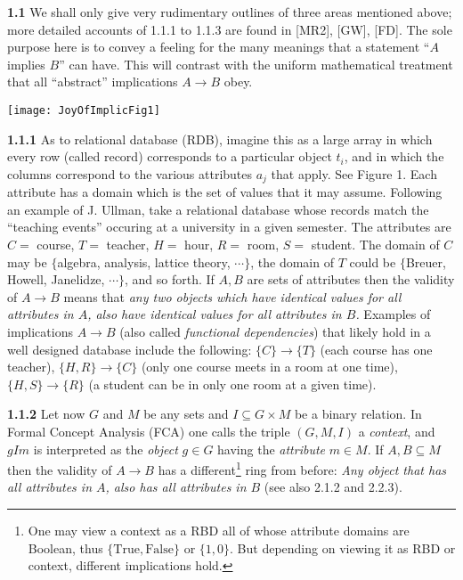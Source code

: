 \documentclass[11pt]{article}
\newcommand{\ra}{\rightarrow}
\begin{document}
{\bf 1.1} We shall only give very rudimentary outlines of three areas mentioned above; more detailed accounts of 1.1.1 to 1.1.3 are found in [MR2], [GW], [FD].  The sole purpose here is to convey a feeling for the many meanings that a statement ``$A$ implies $B$'' can have. This will contrast with the uniform mathematical treatment that all ``abstract'' implications $A \ra B$ obey.

\begin{center}
\texttt{[image: JoyOfImplicFig1]}
\end{center}

{\bf 1.1.1} As to relational database (RDB), imagine this as a large array in which every row (called record) corresponds to a particular object $t_i$, and in which the columns correspond to the various attributes  $a_j$
that apply. See Figure 1. Each attribute has a domain which is the set of values that it may assume. Following an example of J. Ullman, take a relational database whose records match the ``teaching events'' occuring at a university in a given semester. The attributes are $C=$ course, $T=$ teacher, $H=$ hour, $R =$ room, $S=$ student. The domain of $C$ may be $\{$algebra, analysis, lattice theory, $\cdots \}$, the domain of $T$ could be $\{$Breuer, Howell, Janelidze, $ \cdots \}$, and so forth. If $A, B$ are sets of attributes then the validity of $A \ra B$  means that {\it any two objects which have identical values for all attributes in $A$, also have identical values for all attributes in $B$.} Examples of implications $A \ra B$ (also called {\it functional dependencies}) that likely hold in a well designed database include the following: $\{C\} \ra \{T\}$ (each course has one teacher), $\{H,R\} \ra \{C\}$ (only one course meets in a room at one time), $\{H, S\} \ra \{R\}$ (a student can be in only one room at a given time).

{\bf 1.1.2} Let now $G$ and $M$ be any sets and $I \subseteq G \times M$ be a binary relation. In Formal Concept Analysis (FCA) one calls the triple $(G, M, I)$ a {\it context}, and $gIm$ is interpreted as the {\it object} $g \in G$ having the {\it attribute} $m \in M$. If $A, B \subseteq M$ then the validity of $A \ra B$  has a different\footnote{One may view a context as a RBD all of whose attribute domains are Boolean, thus $\{\mbox{True}, \mbox{False}\}$ or $\{1,0\}$. But depending on viewing it as RBD or context, different implications hold.} ring from before:  {\it Any object that has all attributes in $A$, also has all attributes in $B$} (see also 2.1.2 and 2.2.3). 
\end{document}
